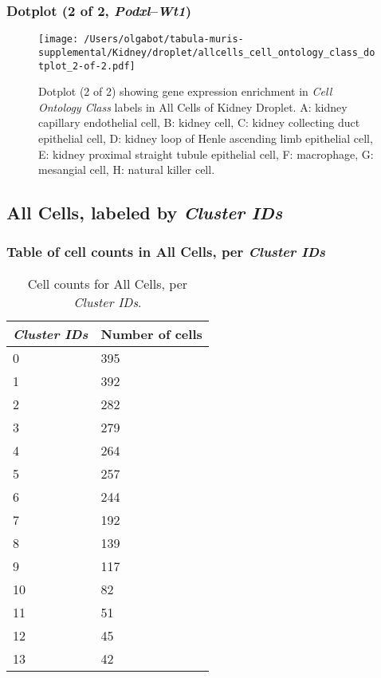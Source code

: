 \clearpage

\subsubsection{Dotplot (2 of 2, \emph{Podxl}--\emph{Wt1})}
\begin{figure}[h]
\centering
\texttt{[image: /Users/olgabot/tabula-muris-supplemental/Kidney/droplet/allcells\_cell\_ontology\_class\_dotplot\_2-of-2.pdf]}

\caption{ Dotplot (2 of 2)  showing gene expression enrichment in \emph{Cell Ontology Class} labels in All Cells of Kidney Droplet. A: kidney capillary endothelial cell, B: kidney cell, C: kidney collecting duct epithelial cell, D: kidney loop of Henle ascending limb epithelial cell, E: kidney proximal straight tubule epithelial cell, F: macrophage, G: mesangial cell, H: natural killer cell.}
\end{figure}


\clearpage

\subsection{All Cells, labeled by \emph{Cluster IDs}}
\subsubsection{Table of cell counts in All Cells, per \emph{Cluster IDs}}\begin{table}[h]
\centering
\label{my-label}
\begin{tabular}{@{}ll@{}}
\toprule

\emph{Cluster IDs}& Number of cells \\ \midrule
0 & 395 \\

1 & 392 \\

2 & 282 \\

3 & 279 \\

4 & 264 \\

5 & 257 \\

6 & 244 \\

7 & 192 \\

8 & 139 \\

9 & 117 \\

10 & 82 \\

11 & 51 \\

12 & 45 \\

13 & 42 \\
\bottomrule
\end{tabular}
\caption{Cell counts for All Cells, per \emph{Cluster IDs}.}
\end{table}

